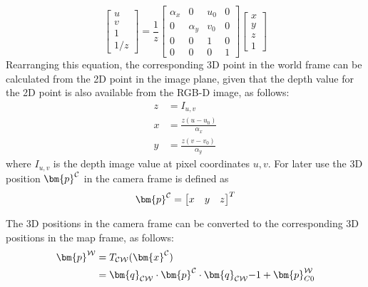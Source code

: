         \begin{equation} \label{eq:local_projection}
            \begin{bmatrix}
                u \\
                v \\
                1 \\
                1/z
            \end{bmatrix}
            = \frac{1}{z}
            \begin{bmatrix}
                \alpha_x & 0 & u_0 & 0 \\
                0 & \alpha_y & v_0 & 0 \\
                0 & 0 & 1 & 0 \\
                0 & 0 & 0 & 1
            \end{bmatrix}
            \begin{bmatrix}
                x\\
                y\\
                z\\
                1
            \end{bmatrix}
        \end{equation}
        Rearranging this equation, the corresponding 3D point in the world frame can be calculated from the 2D point in the image plane, given that the depth value for the 2D point is also available from the RGB-D image, as follows:
        \begin{align}
            z &= I_{u,v} \label{eq:proj_z}\\[0.2cm]
            x &= \frac{z(u - u_0)}{\alpha_x}\label{eq:proj_x} \\
            y &= \frac{z(v - v_0)}{\alpha_y}\label{eq:proj_y}
        \end{align}
        where \(I_{u,v}\) is the depth image value at pixel coordinates \(u,v\). For later use the 3D position \(\bm{p} \inrefframe{C}\) in the camera frame is defined as
        \begin{equation}\label{eq:pcam}
            \bm{p}\inrefframe{C}=
            \begin{bmatrix}
                x &y &z
            \end{bmatrix}^T
        \end{equation}

        \noindent
        The 3D positions in the camera frame can be converted to the corresponding 3D positions in the map frame, as follows:
        \begin{align} \label{eq:camera_to_map}
            \begin{split}
                \bm{p}\inrefframe{\fworld} &= \transframe{\bm{x}\inrefframe{\fcamera}}{\fcamera}{\fworld}\\ 
                &= \bm{q}_{\fcamera\fworld} \cdot \bm{p}\inrefframe{\fcamera} \cdot \bm{q}_{\fcamera\fworld}{-1} + \bm{p}\inrefframe{\fworld}_{C0}
            \end{split}
        \end{align}

